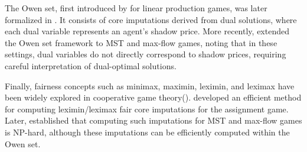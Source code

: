 The Owen set, first introduced by \cite{Owen1975} for linear production games, was later formalized in \cite{Owen.Characterization}. It consists of core imputations derived from dual solutions, where each dual variable represents an agent's shadow price. More recently, \cite{ggsv2024equitablefaircore} extended the Owen set framework to MST and max-flow games, noting that in these settings, dual variables do not directly correspond to shadow prices, requiring careful interpretation of dual-optimal solutions.

Finally, fairness concepts such as minimax, maximin, leximin, and leximax have been widely explored in cooperative game theory(\cite{minimax_group_fairness}). \cite{Vazirani-leximin} developed an efficient method for computing leximin/leximax fair core imputations for the assignment game. Later, \cite{ggsv2024equitablefaircore} established that computing such imputations for MST and max-flow games is NP-hard, although these imputations can be efficiently computed within the Owen set.


